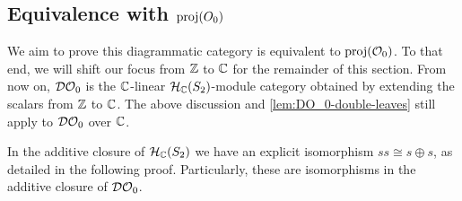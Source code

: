 
\subsection*{Equivalence with $\operatorname{proj}(O_0)$}

We aim to prove this diagrammatic category is equivalent to $\operatorname{proj}(\mathcal{O}_0)$. To that end, we will shift our focus from $\mathbb{Z}$ to $\mathbb{C}$ for the remainder of this section. From now on, $\mathcal{DO}_0$ is the $\mathbb{C}$-linear $\mathcal{H}_{\mathbb{C}}(S_2)$-module category obtained by extending the scalars from $\mathbb{Z}$ to $\mathbb{C}$. The above discussion and \autoref{lem:DO_0-double-leaves} still apply to $\mathcal{DO}_0$ over $\mathbb{C}$.

\begin{lemma}
    \label{lem:ss-equal-2s}
    In the additive closure of $\mathcal{H}_{\mathbb{C}}(S_2)$ we have an explicit isomorphism $ss \cong s \oplus s$, as detailed in the following proof. Particularly, these are isomorphisms in the additive closure of $\mathcal{DO}_0$.
\end{lemma}
